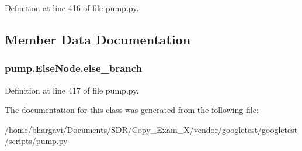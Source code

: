Definition at line 416 of file pump.\+py.



\subsection{Member Data Documentation}
\subsubsection[{\texorpdfstring{else\+\_\+branch}{else_branch}}]{\setlength{\rightskip}{0pt plus 5cm}pump.\+Else\+Node.\+else\+\_\+branch}\hypertarget{classpump_1_1_else_node_ac838a0fe9f5d713c7f56939eed5e128d}{}\label{classpump_1_1_else_node_ac838a0fe9f5d713c7f56939eed5e128d}


Definition at line 417 of file pump.\+py.



The documentation for this class was generated from the following file\+:\begin{DoxyCompactItemize}
\item 
/home/bhargavi/\+Documents/\+S\+D\+R/\+Copy\+\_\+\+Exam\+\_\+X/vendor/googletest/googletest/scripts/\hyperlink{pump_8py}{pump.\+py}\end{DoxyCompactItemize}
